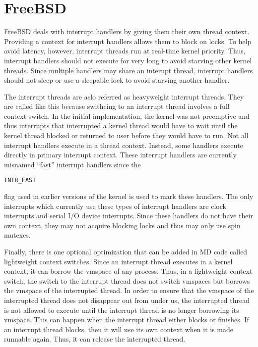 \documentclass[letterpaper,10pt,draftclsnofoot,onecolumn]{IEEEtran}
\begin{document}
%
%

\section*{FreeBSD}

FreeBSD deals with interrupt handlers by giving them their own thread context. Providing a context for interrupt handlers allows them to block on locks. To help avoid latency, however, interrupt threads run at real-time kernel priority. Thus, interrupt handlers should not execute for very long to avoid starving other kernel threads. Since multiple handlers may share an interupt thread, interrupt handlers should not sleep or use a sleepable lock to avoid starving another handler.

The interrupt threads are aslo referred as heavyweight interrupt threads. They are called like this because swithcing to an interrupt thread involves a full context switch. In the initial implementation, the kernel was not preemptive and thus interrupts that interrupted a kernel thread would have to wait until the kernel thread blocked or returned to user before they would have to run. Not all interrupt handlers execute in a thread context. Instead, some handlers execute directly in primary interrupt context. These interrupt handlers are currently misnamed “fast” interrupt handlers since the \begin{verbatim}INTR_FAST\end{verbatim} flag used in earlier versions of the kernel is used to mark these handlers. The only interrupts which currently use these types of interrupt handlers are clock interrupts and serial I/O device interrupts. Since these handlers do not have their own context, they may not acquire blocking locks and thus may only use spin mutexes.\cite{[2]}

Finally, there is one optional optimization that can be added in MD code called lightweight context switches. Since an interrupt thread executes in a kernel context, it can borrow the vmspace of any process. Thus, in a lightweight context switch, the switch to the interrupt thread does not switch vmspaces but borrows the vmspace of the interrupted thread. In order to ensure that the vmspace of the interrupted thread does not disappear out from under us, the interrupted thread is not allowed to execute until the interrupt thread is no longer borrowing its vmspace. This can happen when the interrupt thread either blocks or finishes. If an interrupt thread blocks, then it will use its own context when it is made runnable again. Thus, it can release the interrupted thread.
\end{document}
